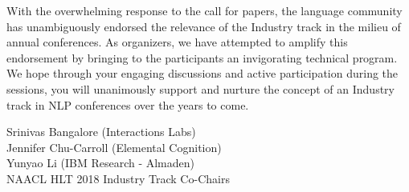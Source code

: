 With the overwhelming response to the call for papers, the language community has unambiguously endorsed the relevance of the Industry track in the milieu of annual conferences.  As organizers, we have attempted to amplify this endorsement by bringing to the participants an invigorating technical program. We hope through your engaging discussions and active participation during the sessions, you will unanimously support and nurture the concept of an Industry track in NLP conferences over the years to come.



\vskip 0.5in
\noindent Srinivas Bangalore (Interactions Labs) \\
Jennifer Chu-Carroll (Elemental Cognition) \\
Yunyao Li (IBM Research - Almaden) \\
NAACL HLT 2018 Industry Track Co-Chairs



